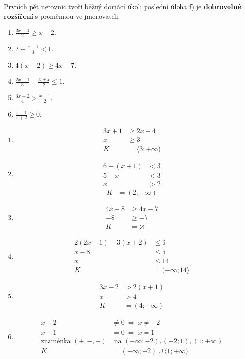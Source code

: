 \documentclass[11pt,a4paper]{article}
\begin{document}
Prvních pět nerovnic tvoří běžný domácí úkol; poslední úloha f) je \textbf{dobrovolné rozšíření} s proměnnou ve jmenovateli.
\begin{zadaniReseniBox}[title={Domácí úkol}]
\begin{enumerate}[label=\alph*)]
\item $\frac{3x+1}{2}\ge x+2$.
\item $2-\frac{x+1}{3}<1$.
\item $4(x-2)\ge4x-7$.
\item $\frac{2x-1}{3}-\frac{x+2}{2}\le1$.
\item $\frac{3x-2}{4}>\frac{x+1}{2}$.
\item $\frac{x-1}{x+2}\ge0$.
\end{enumerate}
\tcblower
\begin{enumerate}[label=\alph*)]
\item
\[\begin{aligned}
3x+1&\ge2x+4 \\
 x&\ge3 \\
 K&=\langle3;+\infty)
\end{aligned}\]

\item
\[\begin{aligned}
6-(x+1)&<3 \\
 5-x&<3 \\
 x&>2
\end{aligned}\]
\[\begin{aligned}K&=(2;+\infty)\end{aligned}\]

\item
\[\begin{aligned}
4x-8&\ge4x-7 \\
 -8&\ge-7 \\
 K&=\varnothing
\end{aligned}\]

\item
\[\begin{aligned}
2(2x-1)-3(x+2)&\le6\\x-8&\le6\\x&\le14\\K&=(-\infty;14\rangle
\end{aligned}\]

\item
\[\begin{aligned}
3x-2&>2(x+1)\\x&>4\\K&=(4;+\infty)
\end{aligned}\]

\item
\[\begin{aligned}
x+2&\ne0\ \Rightarrow\ x\ne-2\\x-1&=0\ \Rightarrow\ x=1\\\text{znaménka }(+,-,+)&\text{ na }(-\infty;-2),(-2;1),(1;+\infty)\\K&=(-\infty;-2)\cup\langle1;+\infty)
\end{aligned}\]
\end{enumerate}
\end{zadaniReseniBox}
\end{document}
